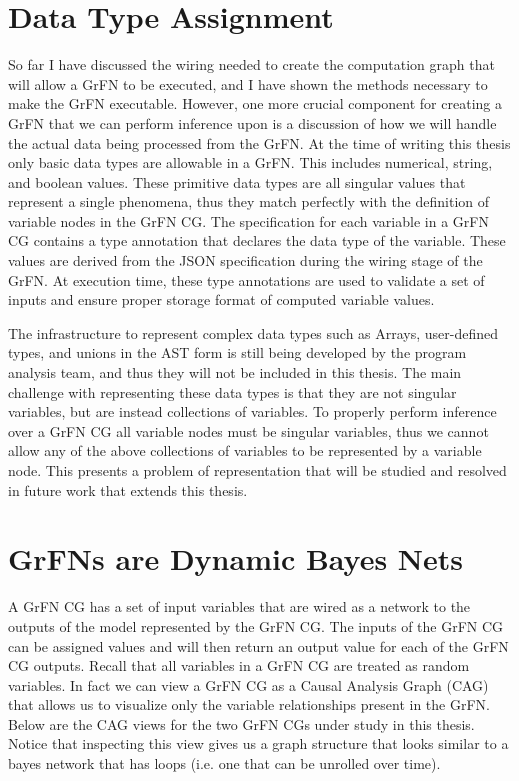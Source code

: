 \section{Data Type Assignment\label{sec:data_types}}
So far I have discussed the wiring needed to create the computation graph that will allow a GrFN to be executed, and I have shown the methods necessary to make the GrFN executable. However, one more crucial component for creating a GrFN that we can perform inference upon is a discussion of how we will handle the actual data being processed from the GrFN. At the time of writing this thesis only basic data types are allowable in a GrFN. This includes numerical, string, and boolean values. These primitive data types are all singular values that represent a single phenomena, thus they match perfectly with the definition of variable nodes in the GrFN CG. The specification for each variable in a GrFN CG contains a type annotation that declares the data type of the variable. These values are derived from the JSON specification during the wiring stage of the GrFN. At execution time, these type annotations are used to validate a set of inputs and ensure proper storage format of computed variable values.

The infrastructure to represent complex data types such as Arrays, user-defined types, and unions in the AST form is still being developed by the program analysis team, and thus they will not be included in this thesis. The main challenge with representing these data types is that they are not singular variables, but are instead collections of variables. To properly perform inference over a GrFN CG all variable nodes must be singular variables, thus we cannot allow any of the above collections of variables to be represented by a variable node. This presents a problem of representation that will be studied  and resolved in future work that extends this thesis.

\section{GrFNs are Dynamic Bayes Nets\label{sec:grfn_as_dbn}}
A GrFN CG has a set of input variables that are wired as a network to the outputs of the model represented by the GrFN CG.
The inputs of the GrFN CG can be assigned values and will then return an output value for each of the GrFN CG outputs.
Recall that all variables in a GrFN CG are treated as random variables.
In fact we can view a GrFN CG as a Causal Analysis Graph (CAG) that allows us to visualize only the variable relationships present in the GrFN.
Below are the CAG views for the two GrFN CGs under study in this thesis. Notice that inspecting this view gives us a graph structure that looks similar to a bayes network that has loops (i.e. one that can be unrolled over time).

